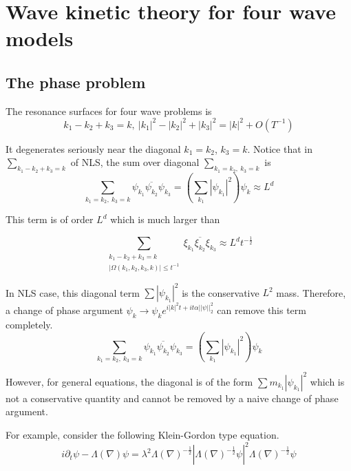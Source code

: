 \section{Wave kinetic theory for four wave models}\label{sec.introfourwave}

\subsection{The phase problem}

The resonance surfaces for four wave problems is 
\begin{equation}
    k_1 - k_2 +k_3 = k,\ |k_1|^2 - |k_2|^2 +|k_3|^2 = |k|^2 + O(T^{-1})
\end{equation}

It degenerates seriously near the diagonal $k_1 = k_2$, $k_3 = k$. Notice that in $\sum_{ k_1 - k_2 + k_3 = k}$ of NLS, the sum over diagonal $\sum_{k_1 = k_2,\ k_3 = k}$ is   
\begin{equation}
    \sum\limits_{k_1 = k_2,\ k_3 = k} \psi_{k_1} \overline{\psi_{k_2}} \psi_{k_3} = \left(\sum\limits_{k_1} |\psi_{k_1}|^2\right) \psi_{k}\approx L^d
\end{equation}

This term is of order $L^d$ which is much larger than

\begin{equation}
\sum\limits_{\substack{ k_1 - k_2 + k_3 = k\\ |\Omega(k_1,k_2,k_3,k)|\le t^{-1}}} \xi_{k_1} \overline{\xi_{k_2}} \xi_{k_3} \approx L^{d}t^{-\frac{1}{2}}
\end{equation}



In NLS case, this diagonal term $\sum |\psi_{k_1}|^2$ is the conservative $L^2$ mass. Therefore, a change of phase argument $\psi_k\rightarrow \psi_ke^{i|k|^2t+it\alpha ||\psi||_{2}^2}$ can remove this term completely.
\begin{equation}
    \sum\limits_{k_1 = k_2,\ k_3 = k} \psi_{k_1} \overline{\psi_{k_2}} \psi_{k_3} = \left(\sum\limits_{k_1} |\psi_{k_1}|^2\right) \psi_{k}
\end{equation}

However, for general equations, the diagonal is of the form $\sum m_{k_1}|\psi_{k_1}|^2$ which is not a conservative quantity and cannot be removed by a naive change of phase argument.

For example, consider the following Klein-Gordon type equation. 
\begin{equation}\label{eq.NKLGintro}
    i\partial_t\psi-\Lambda(\nabla)\psi=\lambda^2 \Lambda(\nabla)^{-\frac{1}{2}}|\Lambda(\nabla)^{-\frac{1}{2}}\psi|^2\Lambda(\nabla)^{-\frac{1}{2}}\psi 
\end{equation}

